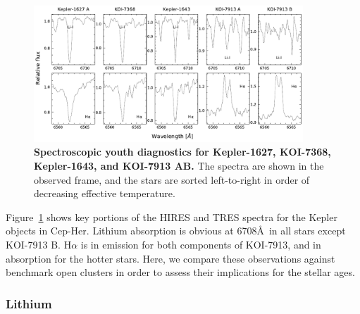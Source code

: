 \documentclass[12pt,twocolumn,tighten,linenumbers,trackchanges]{aastex63}
\begin{document}
\begin{figure}[t]
	\begin{center}
		\leavevmode
			\includegraphics[width=0.9\textwidth]{f5.pdf}
	\end{center}
	\vspace{-0.6cm}
	\caption{
    {\bf Spectroscopic youth diagnostics for Kepler-1627, KOI-7368,
    Kepler-1643, and KOI-7913 AB. }
    The spectra are shown in the observed frame, and the stars are
    sorted left-to-right in order of decreasing effective temperature.
    \label{fig:koiyouthindicators}
	}
\end{figure}

Figure~\ref{fig:koiyouthindicators} shows key portions of the HIRES
and TRES spectra for the Kepler objects in Cep-Her.  Lithium
absorption is obvious at 6708\AA\ in all stars except KOI-7913 B.  
H$\alpha$ is in emission for both components of
KOI-7913, and in absorption for the hotter stars.  Here, we compare
these observations against benchmark open clusters in order to
assess their implications for the stellar ages.

\subsubsection{Lithium}
\end{document}
